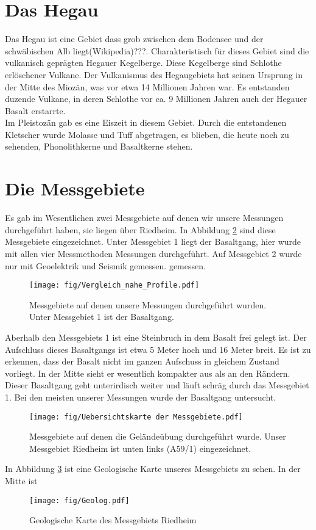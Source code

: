 
\section{Das Hegau}
Das Hegau ist eine Gebiet dass grob zwischen dem Bodensee und der schwäbischen Alb liegt(Wikipedia)???. Charakteristisch für dieses Gebiet sind die vulkanisch 
geprägten Hegauer Kegelberge. Diese Kegelberge sind Schlothe erlöschener Vulkane. Der Vulkanismus des Hegaugebiets hat seinen Ursprung in der Mitte des Miozän, 
was vor etwa 14 Millionen Jahren war. Es entstanden duzende Vulkane, in deren Schlothe vor ca. 9 Millionen Jahren auch der Hegauer Basalt erstarrte.\\
Im Pleistozän gab es eine Eiszeit in diesem Gebiet. Durch die entstandenen Kletscher wurde Molasse und Tuff abgetragen, es blieben, die heute noch zu sehenden, 
Phonolithkerne und Basaltkerne stehen. 






\section{Die Messgebiete}


Es gab im Wesentlichen zwei Messgebiete auf denen wir unsere Messungen durchgeführt haben, sie liegen über Riedheim. In Abbildung \ref{abb:Messgebiete} sind diese Messgebiete 
eingezeichnet. Unter Messgebiet 1 liegt der Basaltgang, hier wurde mit allen vier Messmethoden Messungen durchgeführt. 
Auf Messgebiet 2 wurde nur mit Geoelektrik und Seismik gemessen.
gemessen.
\begin{figure}
 \centering
 \texttt{[image: fig/Vergleich\_nahe\_Profile.pdf]}
 \caption[Messgebiete]{Messgebiete auf denen unsere Messungen durchgeführt wurden. Unter Messgebiet 1 ist der Basaltgang.}
 \label{abb:Messgebiete}
\end{figure}

Aberhalb den Messgebiets 1 ist eine Steinbruch in dem Basalt frei gelegt ist. Der Aufschluss dieses Basaltgangs ist etwa 5 Meter hoch und 16 Meter breit. 
Es ist zu erkennen, dass der Basalt nicht im ganzen Aufschuss in gleichem Zustand vorliegt. In der Mitte sieht er wesentlich kompakter aus als an den Rändern.
Dieser Basaltgang geht unterirdisch weiter und läuft schräg durch das Messgebiet 1. Bei den meisten unserer Messungen wurde der Basaltgang untersucht.

\begin{figure}
 \centering
 \texttt{[image: fig/Uebersichtskarte der Messgebiete.pdf]}
 \caption[Messgebiete]{Messgebiete auf denen die Geländeübung durchgeführt wurde. Unser Messgebiet Riedheim ist unten links (A59/1) eingezeichnet.}
 \label{abb:Messgebiete}
\end{figure}

In Abbildung \ref{abb:Geolog} ist eine Geologische Karte unseres Messgebiets zu sehen. In der Mitte ist


\begin{figure}
 \centering
 \texttt{[image: fig/Geolog.pdf]}
 \caption[Geologische Karte]{Geologische Karte des Messgebiets Riedheim}
 \label{abb:Geolog}
\end{figure}


